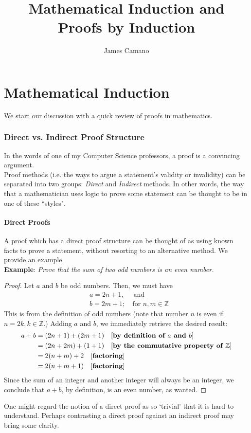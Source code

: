 \documentclass[10pt,a4paper,fleqn]{article}
\author{James Camano}
\title{Mathematical Induction and Proofs by Induction}
\newcommand{\example}[1]{\textbf{Example}: \emph{#1}}
\newcommand{\justification}[1]{\text{[\textbf{#1}]}}
\begin{document}
	\maketitle
	\newpage
	
	\part{Mathematical Induction}
		We start our discussion with a quick review of proofs in mathematics.
		\section{Direct vs. Indirect Proof Structure}
			In the words of one of my Computer Science professors, a proof is a convincing argument. \\ 
			Proof methods (i.e. the ways to argue a statement's validity or invalidity) can be separated into two groups: \emph{Direct} and \emph{Indirect} 	  methods. In other words, the way that a mathematician uses logic to prove some statement can be thought to be in one of these ``styles".
			
		\subsection{Direct Proofs}
			A proof which has a direct proof structure can be thought of as using known facts to prove a statement, without resorting to an alternative method. We provide an example. \\
			
		\noindent \example{Prove that the sum of two odd numbers is an even number.}
		\begin{proof}
			Let $a$ and $b$ be odd numbers. Then, we must have
			\begin{align*}
				&a = 2n + 1, \quad \text{ and}   \\
				&b = 2m + 1; \quad \text{for } n,m \in \mathbb{Z}
			\end{align*}			
			This is from the definition of odd numbers (note that number $n$ is even if $n = 2k, k \in \mathbb{Z}$.) Adding $a$ and $b$, we immediately retrieve the desired result:
			\begin{align*}
				a + b &= (2n + 1) + (2m + 1) \quad \justification{by definition of $a$ and $b$} \\
						 &= (2n + 2m) + (1 + 1) \quad \justification{by the commutative property of $\mathbb{Z}$} \\
						 &= 2(n+m) + 2				\quad \justification{factoring} \\
						 &= 2(n+m+1)				\quad \justification{factoring}
			\end{align*}		
			Since the sum of an integer and another integer will always be an integer, we conclude that $a+b$, by definition, is an even number, as wanted.
		\end{proof}
	One might regard the notion of a direct proof as so `trivial' that it is hard to understand. Perhaps contrasting a direct proof against an indirect proof may bring some clarity.
	
\end{document}

